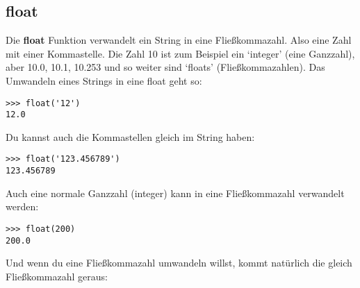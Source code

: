 \subsection*{float}

Die \textbf{float} Funktion verwandelt ein String in eine Fließkommazahl. Also eine Zahl mit einer Kommastelle. Die Zahl 10 ist zum Beispiel ein `integer' (eine Ganzzahl), aber 10.0, 10.1, 10.253 und so weiter sind `floats' (Fließkommazahlen). Das Umwandeln eines Strings in eine float geht so:

\begin{Verbatim}[frame=single]
>>> float('12')
12.0
\end{Verbatim}

\noindent
Du kannst auch die Kommastellen gleich im String haben:

\begin{Verbatim}[frame=single]
>>> float('123.456789')
123.456789
\end{Verbatim}

\noindent
Auch eine normale Ganzzahl (integer) kann in eine Fließkommazahl verwandelt werden:

\begin{Verbatim}[frame=single]
>>> float(200)
200.0
\end{Verbatim}

\noindent
Und wenn du eine Fließkommazahl umwandeln willst, kommt natürlich die gleich Fließkommazahl geraus:

